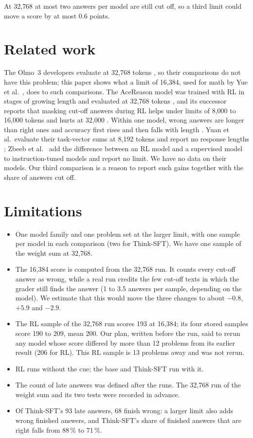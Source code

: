 \documentclass[10pt]{article}
\begin{document}
At 32{,}768 at most two answers per model are still cut off, so a third limit could move a score by at most 0.6
points.

\section{Related work}

The Olmo~3 developers evaluate at 32{,}768 tokens \cite{olmo2025olmo3}, so their comparisons do not have this
problem; this paper shows what a limit of 16{,}384, used for math by Yue et al.\ \cite{yue2025doesrl}, does to such comparisons.
The AceReason model was trained with RL in stages of growing length and evaluated at 32{,}768 tokens
\cite{chen2025acereason}, and its successor reports that masking cut-off answers during RL helps under limits of
8{,}000 to 16{,}000 tokens and hurts at 32{,}000 \cite{liu2025acereason}. Within one model, wrong answers are
longer than right ones \cite{su2025underthinking} and accuracy first rises and then falls with length
\cite{wu2025whenmore}. Yuan et al.\ evaluate their task-vector sums at 8{,}192 tokens and report no response
lengths \cite{yuan2026dots}; Zbeeb et al.\ \cite{zbeeb2025reasoningvectors} add the difference between an RL
model and a supervised model to instruction-tuned models and report no limit. We have no data on their models. Our third
comparison is a reason to report such gains together with the share of answers cut off.

\section{Limitations}

\begin{itemize}
\item One model family and one problem set at the larger limit, with one sample per model in each comparison (two
for Think-SFT). We have one sample of the weight sum at 32{,}768.
\item The 16{,}384 score is computed from the 32{,}768 run. It counts every cut-off answer as wrong, while a real
run credits the few cut-off texts in which the grader still finds the answer (1 to 3.5 answers per sample, depending on the model). We
estimate that this would move the three changes to about $-0.8$, $+5.9$ and $-2.9$.
\item The RL sample of the 32{,}768 run scores 193 at 16{,}384; its four stored samples score 190 to 209, mean
200. Our plan, written before the run, said to rerun any model whose score differed by more than 12 problems
from its earlier result (206 for RL). This RL sample is 13 problems away and was not rerun.
\item RL runs without the cue; the base and Think-SFT run with it.
\item The count of late answers was defined after the runs. The 32{,}768 run of the weight sum and its two tests
were recorded in advance.
\item Of Think-SFT's 93 late answers, 68 finish wrong: a larger limit also adds wrong finished answers, and
Think-SFT's share of finished answers that are right falls from 88\,\% to 71\,\%.
\end{itemize}
\end{document}
